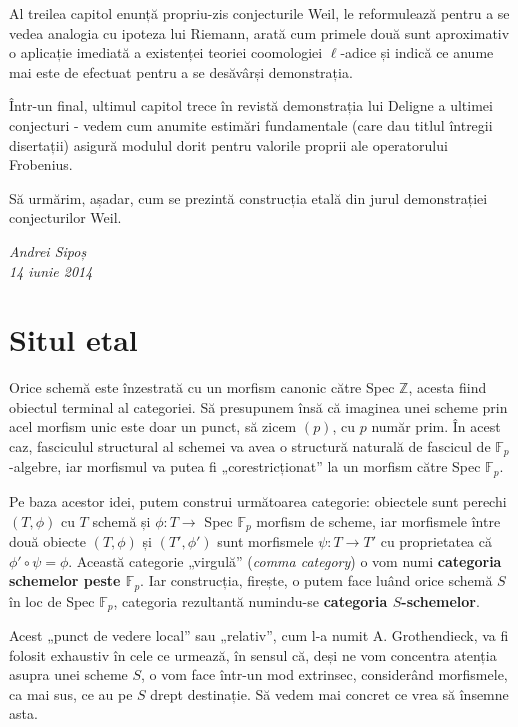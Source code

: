 \documentclass[13pt,openany,oneside]{book}
\begin{document}
Al treilea capitol enunță propriu-zis conjecturile Weil, le reformulează pentru a se vedea analogia cu ipoteza lui Riemann, arată cum primele două sunt aproximativ o aplicație imediată a existenței teoriei coomologiei $\ell$-adice și indică ce anume mai este de efectuat pentru a se desăvârși demonstrația.

Într-un final, ultimul capitol trece în revistă demonstrația lui Deligne a ultimei conjecturi - vedem cum anumite estimări fundamentale (care dau titlul întregii disertații) asigură modulul dorit pentru valorile proprii ale operatorului Frobenius.

Să urmărim, așadar, cum se prezintă construcția etală din jurul demonstrației conjecturilor Weil.

\begin{flushright}
{\em Andrei Sipoș\\14 iunie 2014}
\end{flushright}

\newpage

\pagestyle{headings}
\setcounter{secnumdepth}{2}

\chapter{Situl etal}
\setcounter{page}{1}

Orice schemă este înzestrată cu un morfism canonic către Spec $\mathbb{Z}$, acesta fiind obiectul terminal al categoriei. Să presupunem însă că imaginea unei scheme prin acel morfism unic este doar un punct, să zicem $(p)$, cu $p$ număr prim. În acest caz, fasciculul structural al schemei va avea o structură naturală de fascicul de $\mathbb{F}_p$-algebre, iar morfismul va putea fi „corestricționat” la un morfism către Spec $\mathbb{F}_p$.

Pe baza acestor idei, putem construi următoarea categorie: obiectele sunt perechi $(T,\phi)$ cu $T$ schemă și $\phi: T \rightarrow$ Spec $\mathbb{F}_p$ morfism de scheme, iar morfismele între două obiecte $(T,\phi)$ și $(T',\phi')$ sunt morfismele $\psi: T \rightarrow T'$ cu proprietatea că $\phi'\circ\psi=\phi$. Această categorie „virgulă” ({\it comma category}) o vom numi {\bf categoria schemelor peste $\mathbb{F}_p$}. Iar construcția, firește, o putem face luând orice schemă $S$ în loc de Spec $\mathbb{F}_p$, categoria rezultantă numindu-se {\bf categoria $S$-schemelor}.

Acest „punct de vedere local” sau „relativ”, cum l-a numit A. Grothendieck, va fi folosit exhaustiv în cele ce urmează, în sensul că, deși ne vom concentra atenția asupra unei scheme $S$, o vom face într-un mod extrinsec, considerând morfismele, ca mai sus, ce au pe $S$ drept destinație. Să vedem mai concret ce vrea să însemne asta.
\end{document}
